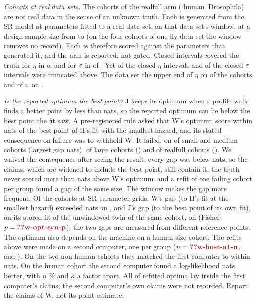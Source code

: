 \emph{Cohorts at real data sets.} The  cohorts of the realfull arm ( human, 
Drosophila) are not real data in the sense of an unknown truth. Each is generated from the SR model at parameters fitted to a
real data set, on that data set's window, at a design sample size from  to  (on the four cohorts of
one fly data set the window removes no record). Each is therefore scored against the parameters that generated it, and the arm
is reported, not gated. Closed intervals covered the truth for
$\eta$ in  of  and for $\varepsilon$ in  of . Yet  of the
 closed $\eta$ intervals and  of the  closed $\varepsilon$ intervals were truncated above. The
data set the upper end of $\eta$ on  of the  cohorts and of $\varepsilon$ on .

\emph{Is the reported optimum the best point?} J keeps its optimum when a profile walk finds a better point by less than
 nats, so the reported optimum can lie below the best point the fit saw. A pre-registered rule asked that W's
optimum score within  nats of the best point of H's fit with the smallest hazard, and its stated consequence on
failure was to withhold W. It failed, on  of  small and medium cohorts (largest gap
 nats),  of  large cohorts () and  of 
realfull cohorts (). We waived the consequence after seeing the result: every gap was below 
nats, so the claims, which are widened to include the best point, still contain it; the truth never scored more than
 nats above W's optimum; and a refit of one failing cohort per group found a gap of the same size. The window makes the
gap more frequent. Of the  cohorts at SR parameter grids, W's gap (to H's fit at the smallest hazard) exceeded
 nats on , and J's gap (to the best point of its own fit), on its stored fit of the unwindowed twin of
the same cohort, on  (Fisher $p=\C{w-opt-syn-p}$); the two gaps are measured from different reference points.
The optimum also depends on the machine on a human-size cohort. The refits above were made on a second computer, one per
group ($n=\C{w-host-a1-n}$,  and ). On the two non-human cohorts they matched the first
computer to within  nats. On the human cohort the second computer found a log-likelihood 
nats better, with $\eta$ \,\% and $\kappa$ a factor  apart. All  of
 refitted optima lay inside the first computer's claims; the second computer's own claims were not recorded.
Report the claims of W, not its point estimate.

